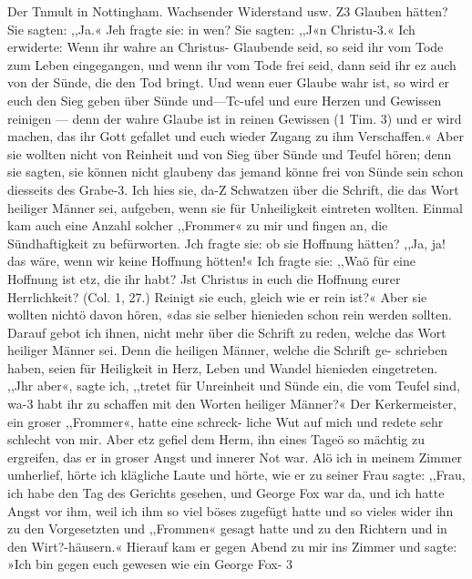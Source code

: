 Der Tnmult in Nottingham. Wachsender Widerstand usw. Z3
Glauben hätten? Sie sagten: ,,Ja.« Jeh fragte sie: in wen?
Sie sagten: ,,J«n Christu-3.« Ich erwiderte: Wenn ihr wahre
an Christus- Glaubende seid, so seid ihr vom Tode zum Leben
eingegangen, und wenn ihr vom Tode frei seid, dann seid ihr ez
auch von der Sünde, die den Tod bringt. Und wenn euer
Glaube wahr ist, so wird er euch den Sieg geben über Sünde
und—Tc-ufel und eure Herzen und Gewissen reinigen — denn der
wahre Glaube ist in reinen Gewissen (1 Tim. 3) und er wird
machen, das ihr Gott gefallet und euch wieder Zugang zu ihm
Verschaffen.« Aber sie wollten nicht von Reinheit und von Sieg
über Sünde und Teufel hören; denn sie sagten, sie können nicht
glaubeny das jemand könne frei von Sünde sein schon diesseits
des Grabe-3. Ich hies sie, da-Z Schwatzen über die Schrift, die
das Wort heiliger Männer sei, aufgeben, wenn sie für Unheiligkeit
eintreten wollten. Einmal kam auch eine Anzahl solcher ,,Frommer«
zu mir und fingen an, die Sündhaftigkeit zu befürworten. Jch
fragte sie: ob sie Hoffnung hätten? ,,Ja, ja! das wäre, wenn
wir keine Hoffnung hötten!« Ich fragte sie: ,,Waö für eine
Hoffnung ist etz, die ihr habt? Jst Christus in euch die Hoffnung
eurer Herrlichkeit? (Col. 1, 27.) Reinigt sie euch, gleich wie er
rein ist?« Aber sie wollten nichtö davon hören, «das sie selber
hienieden schon rein werden sollten. Darauf gebot ich ihnen,
nicht mehr über die Schrift zu reden, welche das Wort heiliger
Männer sei. Denn die heiligen Männer, welche die Schrift ge-
schrieben haben, seien für Heiligkeit in Herz, Leben und Wandel
hienieden eingetreten. ,,Jhr aber«, sagte ich, ,,tretet für Unreinheit
und Sünde ein, die vom Teufel sind, wa-3 habt ihr zu schaffen
mit den Worten heiliger Männer?«
Der Kerkermeister, ein groser ,,Frommer«, hatte eine schreck-
liche Wut auf mich und redete sehr schlecht von mir. Aber etz
gefiel dem Herm, ihn eines Tageö so mächtig zu ergreifen, das
er in groser Angst und innerer Not war. Alö ich in meinem
Zimmer umherlief, hörte ich klägliche Laute und hörte, wie er zu
seiner Frau sagte: ,,Frau, ich habe den Tag des Gerichts gesehen,
und George Fox war da, und ich hatte Angst vor ihm, weil ich
ihm so viel böses zugefügt hatte und so vieles wider ihn zu den
Vorgesetzten und ,,Frommen« gesagt hatte und zu den Richtern
und in den Wirt?-häusern.« Hierauf kam er gegen Abend zu mir
ins Zimmer und sagte: »Ich bin gegen euch gewesen wie ein
George Fox- 3


